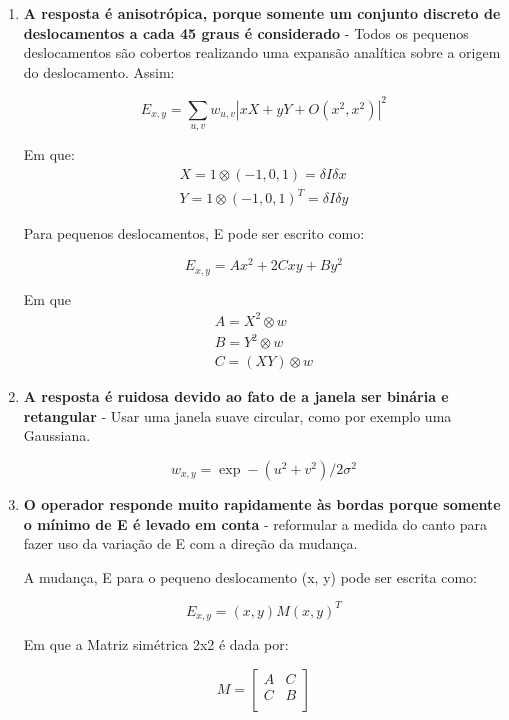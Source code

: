 \documentclass[10pt,a4paper]{article}
\begin{document}
\begin{enumerate}
\item \textbf{A resposta é anisotrópica, porque somente um
conjunto discreto de deslocamentos a cada 45 graus é
considerado} - Todos os pequenos deslocamentos são cobertos
realizando uma expansão analítica sobre a origem do deslocamento.
Assim:

\begin{equation}
E_{x,y}=\sum_{u,v}w_{u,v}\left | xX +yY + O(x^2,x^2) \right  |^2 
\end{equation}

Em que:
\begin{eqnarray*}
X = 1 \otimes (-1,0,1)= \delta I \delta x\\
Y = 1 \otimes (-1,0,1)^T= \delta I \delta y
\end{eqnarray*}

Para pequenos deslocamentos, E pode ser escrito como:

\begin{equation}
E_{x,y}=Ax^2+ 2Cxy + By^2 
\end{equation}

Em que 
\begin{eqnarray*}
A= X^2\otimes w\\
B= Y^2\otimes w\\
C= (XY)\otimes w
\end{eqnarray*}

\item \textbf{A resposta é ruidosa devido ao fato de a  janela ser
    binária e retangular} - Usar uma janela suave circular, como por
  exemplo uma Gaussiana.

\begin{equation}
w_{x,y}=\exp-(u^2+ v^2)/2\sigma^2 
\end{equation}

\item \textbf{O operador responde muito rapidamente às bordas
porque somente o mínimo de E é levado em
conta} - reformular a medida do canto para fazer uso da variação de E com a direção da mudança.

A mudança, E para o pequeno deslocamento (x, y) pode ser escrita como:

\begin{equation}
E_{x,y}=(x,y)M(x,y)^T
\end{equation}

Em que a Matriz simétrica 2x2 é dada por:


\[
 M = \begin{bmatrix}
       A & C \\[0.3em]
       C & B \\[0.3em]
     \end{bmatrix}
\]


\end{enumerate}
\end{document}
